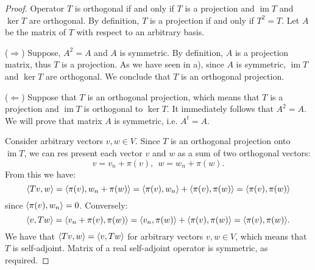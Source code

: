 \documentclass{article}
\theoremstyle{definition}
\DeclareMathOperator{\im}{\operatorname{im}}
\DeclarePairedDelimiter\bilform{\langle}{\rangle}
\begin{document}
\begin{proof}

Operator $T$ is orthogonal if and only if $T$ is a projection and $\im T$ and $\ker T$ are orthogonal.
By definition, $T$ is a projection if and only if $T^2 = T$.
Let $A$ be the matrix of $T$ with respect to an arbitrary basis.

($\Rightarrow$)
Suppose, $A^2 = A$ and $A$ is symmetric.
By definition, $A$ is a projection matrix, thus $T$ is a projection.
As we have seen in a), since $A$ is symmetric, $\im T$ and $\ker T$ are orthogonal.
We conclude that $T$ is an orthogonal projection.

($\Leftarrow$)
Suppose that $T$ is an orthogonal projection, which means that $T$ is a projection and $\im T$ is orthogonal to $\ker T$.
It immediately follows that $A^2=A$.
We will prove that matrix $A$ is symmetric, i.e. $A^t = A$.

Consider arbitrary vectors $v, w \in V$.
Since $T$ is an orthogonal projection onto $\im T$, we can res present each vector $v$ and $w$ as a sum of two orthogonal vectors:
\[
	v = v_n + \pi(v), \>\> w = w_n + \pi(w).
\]
From this we have:
\[
	\bilform{Tv, w} 
	= \bilform{\pi(v), w_n + \pi(w)} 
	= \bilform{\pi(v), w_n} + \bilform{\pi(v), \pi(w)}
	= \bilform{\pi(v), \pi(w)}
\]
since $\bilform{\pi(v), w_n} = 0$.
Conversely: 
\[
	\bilform{v, Tw} 
	= \bilform{v_n + \pi(v), \pi(w)} 
	= \bilform{v_n, \pi(w)} + \bilform{\pi(v), \pi(w)}
	= \bilform{\pi(v), \pi(w)}.
\]
We have that $\bilform{Tv, w} = \bilform{v, Tw}$ for arbitrary vectors $v,w \in V$, which means that $T$ is self-adjoint.
Matrix of a real self-adjoint operator is symmetric, as required.

\end{proof}
\end{document}
